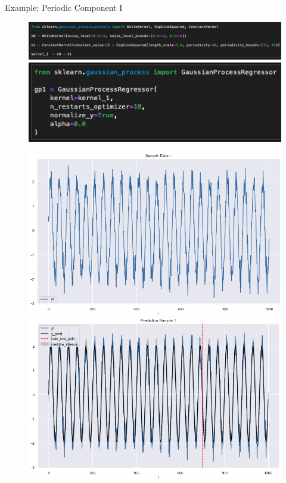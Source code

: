 \documentclass[10pt]{beamer}
\begin{document}
\begin{frame}{Example: Periodic Component I}{\cite[Section 1.7. Gaussian Processes]{scikitlearn}}
\begin{center}
\begin{figure}
\includegraphics[scale=0.3]{images/code_kernel_1_example3.png}
\includegraphics[scale=0.3]{images/gp1_example3.png}
\end{figure}
\end{center}
\begin{center}
\begin{figure}
\includegraphics[scale=0.20]{images/sample_1_example3.png}
\includegraphics[scale=0.20]{images/pred_1_example3.png}
\end{figure}
\end{center}
\end{frame}
\end{document}
